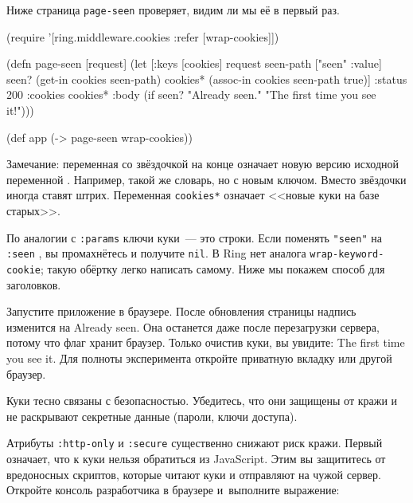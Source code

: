 Ниже страница \verb|page-seen| проверяет, видим ли мы её в первый раз.


\begin{english}
  \begin{clojure/lines}
(require '[ring.middleware.cookies
           :refer [wrap-cookies]])

(defn page-seen [request]
  (let [{:keys [cookies]} request
        seen-path ["seen" :value]
        seen? (get-in cookies seen-path)
        cookies* (assoc-in cookies seen-path true)]
    {:status 200
     :cookies cookies*
     :body (if seen?
             "Already seen."
             "The first time you see it!")}))

(def app (-> page-seen
             wrap-cookies))
  \end{clojure/lines}
\end{english}

Замечание: переменная со звёздочкой на конце означает новую версию исходной
переменной . Например, такой же словарь, но с новым ключом. Вместо
звёздочки иногда ставят штрих. Переменная \verb|cookies*| означает <<новые
куки на базе старых>>.


По аналогии с \verb|:params| ключи куки~--- это строки. Если поменять
\verb|"seen"| на \verb|:seen| , вы промахнётесь и получите
\verb|nil|. В Ring нет аналога \verb|wrap-keyword-cookie|; такую обёртку
легко написать самому. Ниже мы покажем способ для заголовков.

Запустите приложение в браузере. После обновления страницы надпись изменится на
Already seen. Она останется даже после перезагрузки сервера, потому что флаг
хранит браузер. Только очистив куки, вы увидите: The first time you see
it. Для полноты эксперимента откройте приватную вкладку или другой браузер.


Куки тесно связаны с безопасностью. Убедитесь, что они защищены от кражи и не
раскрывают секретные данные (пароли, ключи доступа).

Атрибуты \verb|:http-only| и \verb|:secure| существенно снижают риск
кражи. Первый означает, что к куки нельзя обратиться из JavaScript. Этим вы
защититесь от вредоносных скриптов, которые читают куки и отправляют на чужой
сервер. Откройте консоль разработчика в браузере и~выполните выражение:

